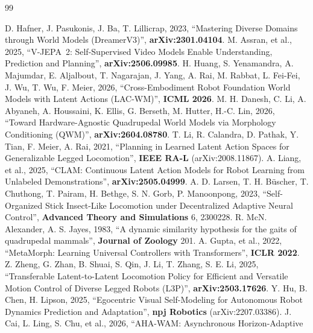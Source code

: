 \documentclass[12pt,a4paper,oneside]{report}
\begin{document}
\begin{thebibliography}{99}
  \setlength{\itemsep}{4pt}

   D. Hafner, J. Pasukonis, J. Ba, T. Lillicrap, 2023, ``Mastering Diverse Domains through
    World Models (DreamerV3)'', \textbf{arXiv:2301.04104}.
   M. Assran, et al., 2025, ``V-JEPA~2: Self-Supervised Video Models Enable Understanding,
    Prediction and Planning'', \textbf{arXiv:2506.09985}.
   H. Huang, S. Yenamandra, A. Majumdar, E. Aljalbout, T. Nagarajan, J. Yang, A. Rai,
    M. Rabbat, L. Fei-Fei, J. Wu, T. Wu, F. Meier, 2026, ``Cross-Embodiment Robot Foundation World Models with
    Latent Actions (LAC-WM)'', \textbf{ICML 2026}.
   M. H. Danesh, C. Li, A. Abyaneh, A. Houssaini, K. Ellis, G. Berseth, M. Hutter,
    H.-C. Lin, 2026, ``Toward Hardware-Agnostic Quadrupedal World Models via Morphology Conditioning (QWM)'',
    \textbf{arXiv:2604.08780}.
   T. Li, R. Calandra, D. Pathak, Y. Tian, F. Meier, A. Rai, 2021, ``Planning in Learned Latent
    Action Spaces for Generalizable Legged Locomotion'', \textbf{IEEE RA-L} (arXiv:2008.11867).
   A. Liang, et al., 2025, ``CLAM: Continuous Latent Action Models for Robot Learning from
    Unlabeled Demonstrations'', \textbf{arXiv:2505.04999}.
   A. D. Larsen, T. H. B\"uscher, T. Chuthong, T. Pairam, H. Bethge, S. N. Gorb,
    P. Manoonpong, 2023, ``Self-Organized Stick Insect-Like Locomotion under Decentralized Adaptive Neural
    Control'', \textbf{Advanced Theory and Simulations} 6, 2300228.
   R. McN. Alexander, A. S. Jayes, 1983, ``A dynamic similarity hypothesis for the gaits of
    quadrupedal mammals'', \textbf{Journal of Zoology} 201.
   A. Gupta, et al., 2022, ``MetaMorph: Learning Universal Controllers with Transformers'',
    \textbf{ICLR 2022}.
   Z. Zheng, G. Zhan, B. Shuai, S. Qin, J. Li, T. Zhang, S. E. Li, 2025, ``Transferable
    Latent-to-Latent Locomotion Policy for Efficient and Versatile Motion Control of Diverse Legged Robots (L3P)'',
    \textbf{arXiv:2503.17626}.
   Y. Hu, B. Chen, H. Lipson, 2025, ``Egocentric Visual Self-Modeling for Autonomous Robot
    Dynamics Prediction and Adaptation'', \textbf{npj Robotics} (arXiv:2207.03386).
   J. Cai, L. Ling, S. Chu, et al., 2026, ``AHA-WAM: Asynchronous Horizon-Adaptive

\end{thebibliography}
\end{document}
